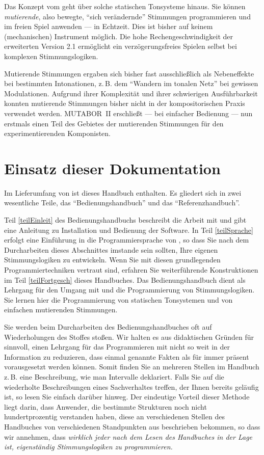Das Konzept vom \mutabor{} geht über solche
statischen Tonsysteme hinaus. Sie können {\em mutierende}, also bewegte,
"`sich verändernde"' Stimmungen programmieren und im freien Spiel
anwenden --- in Echtzeit. Dies ist bisher auf keinem (mechanischen)
Instrument möglich. Die hohe Rechengeschwindigkeit der erweiterten
Version 2.1 er\-mög\-licht ein verzögerungsfreies Spielen selbst bei
komplexen Stimmungslogiken.

Mutierende Stimmungen ergaben sich bisher fast ausschließlich als
Nebeneffekte bei bestimmten Intonationen, z.\,B. dem "`Wandern im
tonalen Netz"' bei gewissen Modulationen. Aufgrund ihrer
Komplexität und ihrer schwierigen Ausführbarkeit konnten
mutierende Stimmungen bisher nicht in der kompositorischen Praxis
verwendet werden. MUTABOR~II erschließt --- bei
einfacher Bedienung --- nun erstmals einen Teil des Gebietes der
mutierenden Stimmungen für den experimentierenden Komponisten.

\section{Einsatz dieser Dokumentation}\label{sec:eins-dies-dokum}

Im Lieferumfang von \mutabor{} ist dieses Handbuch
enthalten. Es gliedert sich in zwei wesentliche Teile, das "`Be\-die\-nungs\-hand\-buch"' und das
"`Referenzhandbuch"'.

Teil \ref{teilEinleit} des
Be\-die\-nungs\-hand\-buchs beschreibt die Arbeit
mit \mutabor{} und gibt eine Anleitung zu Installation und Bedienung
der Software. In Teil \ref{teilSprache} erfolgt eine Einführung in die
Programmiersprache von \mutabor{}, so dass Sie nach dem Durcharbeiten
dieses Abschnittes imstande sein sollten, Ihre eigenen
Stimmungslogiken zu entwickeln. Wenn Sie mit diesen grundlegenden
Programmiertechniken ver\-traut sind, erfahren Sie
wei\-ter\-füh\-ren\-de Konstruktionen im Teil \ref{teilFortgesch}
dieses Handbuches.  Das Bedienungs\-hand\-buch dient als Lehrgang für
den Umgang mit \mutabor{} und die Programmierung von Stimmungslogiken.
Sie lernen hier die Programmierung von statischen Tonsystemen und von
einfachen mutierenden Stimmungen.

Sie werden beim Durcharbeiten des Bedienungshandbuches oft auf
Wiederholungen des Stoffes stoßen. Wir
halten es aus didaktischen Gründen für sinnvoll, einen Lehrgang für
das Programmieren mit \mutabor{} nicht so weit in der Information zu
reduzieren, dass einmal genannte Fakten als für immer präsent
vorausgesetzt werden können.  Somit finden Sie an mehreren Stellen im
Handbuch z.\,B. eine Beschreibung, wie man Intervalle deklariert. Falls
Sie auf die wiederholte Beschreibungen eines Sachverhaltes treffen,
der Ihnen bereits geläufig ist, so lesen Sie einfach darüber hinweg.
Der eindeutige Vorteil dieser Methode liegt darin, dass Anwender, die
bestimmte Strukturen noch nicht hundertprozentig verstanden haben,
diese an verschiedenen Stellen des Handbuches von verschiedenen
Standpunkten aus beschrieben bekommen, so dass wir annehmen, dass {\em
  wirklich jeder nach dem Lesen des Handbuches in der Lage ist,
  eigenständig Stimmungslogiken zu programmieren.}


